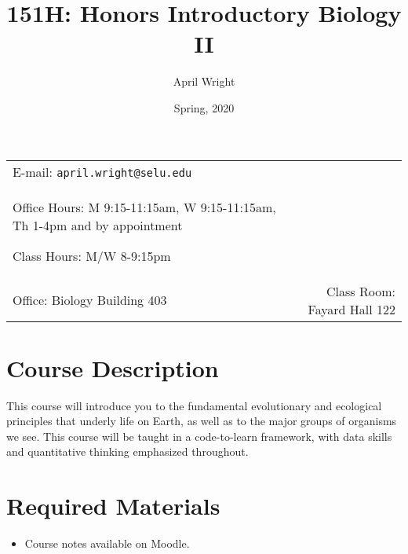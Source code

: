 \documentclass[11pt]{article}
\title{151H: Honors Introductory Biology II}
\author{April Wright}
\date{Spring, 2020}
\newcommand{\blankline}{\quad\pagebreak[2]}
\begin{document}
\maketitle

\blankline

\begin{tabular*}{.93\textwidth}{@{\extracolsep{\fill}}lr}


E-mail: \texttt{april.wright@selu.edu}  \\

 Office Hours: M 9:15-11:15am, W 9:15-11:15am, Th 1-4pm  and by appointment 
 
 Class Hours: M/W 8-9:15pm \\

 Office: Biology Building 403 & Class Room: Fayard Hall 122 \\
\hline
\end{tabular*}

\vspace{5 mm}


\section*{Course Description}

This course will introduce you to the fundamental evolutionary and ecological principles that underly life on Earth, as well as to the major groups of organisms we see. This course will be taught in a code-to-learn framework, with data skills and quantitative thinking emphasized throughout.



\section*{Required Materials}

\begin{itemize}
\item Course notes available on Moodle. 
\end{itemize}

\end{document}
